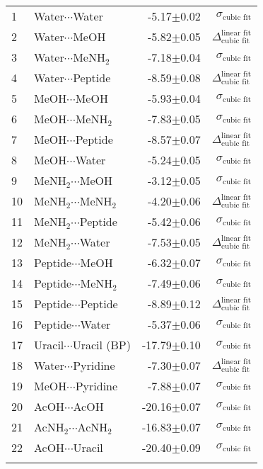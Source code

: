\begin{longtable}{llrr}
1 & Water$\cdots$Water & -5.17$\pm$0.02 & $\sigma_\text{cubic fit}$ \\
2 & Water$\cdots$MeOH & -5.82$\pm$0.05 & $\Delta_\text{cubic fit}^\text{linear fit}$ \\
3 & Water$\cdots$MeNH$_2$ & -7.18$\pm$0.04 & $\sigma_\text{cubic fit}$ \\
4 & Water$\cdots$Peptide & -8.59$\pm$0.08 & $\Delta_\text{cubic fit}^\text{linear fit}$ \\
5 & MeOH$\cdots$MeOH & -5.93$\pm$0.04 & $\sigma_\text{cubic fit}$ \\
6 & MeOH$\cdots$MeNH$_2$ & -7.83$\pm$0.05 & $\sigma_\text{cubic fit}$ \\
7 & MeOH$\cdots$Peptide & -8.57$\pm$0.07 & $\Delta_\text{cubic fit}^\text{linear fit}$ \\
8 & MeOH$\cdots$Water & -5.24$\pm$0.05 & $\sigma_\text{cubic fit}$ \\
9 & MeNH$_2$$\cdots$MeOH & -3.12$\pm$0.05 & $\sigma_\text{cubic fit}$ \\
10 & MeNH$_2$$\cdots$MeNH$_2$ & -4.20$\pm$0.06 & $\Delta_\text{cubic fit}^\text{linear fit}$ \\
11 & MeNH$_2$$\cdots$Peptide & -5.42$\pm$0.06 & $\sigma_\text{cubic fit}$ \\
12 & MeNH$_2$$\cdots$Water & -7.53$\pm$0.05 & $\Delta_\text{cubic fit}^\text{linear fit}$ \\
13 & Peptide$\cdots$MeOH & -6.32$\pm$0.07 & $\sigma_\text{cubic fit}$ \\
14 & Peptide$\cdots$MeNH$_2$ & -7.49$\pm$0.06 & $\sigma_\text{cubic fit}$ \\
15 & Peptide$\cdots$Peptide & -8.89$\pm$0.12 & $\Delta_\text{cubic fit}^\text{linear fit}$ \\
16 & Peptide$\cdots$Water & -5.37$\pm$0.06 & $\sigma_\text{cubic fit}$ \\
17 & Uracil$\cdots$Uracil (BP) & -17.79$\pm$0.10 & $\sigma_\text{cubic fit}$ \\
18 & Water$\cdots$Pyridine & -7.30$\pm$0.07 & $\Delta_\text{cubic fit}^\text{linear fit}$ \\
19 & MeOH$\cdots$Pyridine & -7.88$\pm$0.07 & $\sigma_\text{cubic fit}$ \\
20 & AcOH$\cdots$AcOH & -20.16$\pm$0.07 & $\sigma_\text{cubic fit}$ \\
21 & AcNH$_2$$\cdots$AcNH$_2$ & -16.83$\pm$0.07 & $\sigma_\text{cubic fit}$ \\
22 & AcOH$\cdots$Uracil & -20.40$\pm$0.09 & $\sigma_\text{cubic fit}$ \\
$$
\end{longtable}
